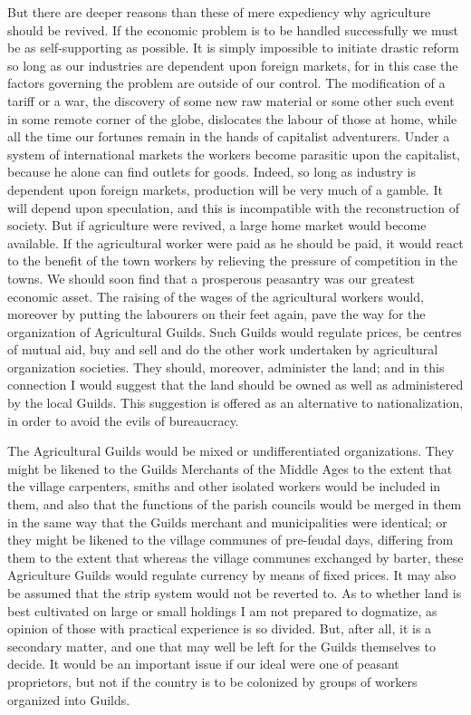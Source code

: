 \documentclass{book}
\begin{document}
But there are deeper reasons than these of mere expediency why agriculture should be revived. If the economic problem is to be handled successfully we must be as self-supporting as possible. It is simply impossible to initiate drastic reform so long as our industries are dependent upon foreign markets, for in this case the factors governing the problem are outside of our control. The modification of a tariff or a war, the discovery of some new raw material or some other such event in some remote corner of the globe, dislocates the labour of those at home, while all the time our fortunes remain in the hands of capitalist adventurers. Under a system of international markets the workers become parasitic upon the capitalist, because he alone can find outlets for goods. Indeed, so long as industry is dependent upon foreign markets, production will be very much of a gamble. It will depend upon speculation, and this is incompatible with the reconstruction of society. But if agriculture were revived, a large home market would become available. If the agricultural worker were paid as he should be paid, it would react to the benefit of the town workers by relieving the pressure of competition in the towns. We should soon find that a prosperous peasantry was our greatest economic asset. The raising of the wages of the agricultural workers would, moreover by putting the labourers on their feet again, pave the way for the organization of Agricultural Guilds. Such Guilds would regulate prices, be centres of mutual aid, buy and sell and do the other work undertaken by agricultural organization societies. They should, moreover, administer the land; and in this connection I would suggest that the land should be owned as well as administered by the local Guilds. This suggestion is offered as an alternative to nationalization, in order to avoid the evils of bureaucracy.

The Agricultural Guilds would be mixed or undifferentiated organizations. They might be likened to the Guilds Merchants of the Middle Ages to the extent that the village carpenters, smiths and other isolated workers would be included in them, and also that the functions of the parish councils would be merged in them in the same way that the Guilds merchant and municipalities were identical; or they might be likened to the village communes of pre-feudal days, differing from them to the extent that whereas the village communes exchanged by barter, these Agriculture Guilds would regulate currency by means of fixed prices. It may also be assumed that the strip system would not be reverted to. As to whether land is best cultivated on large or small holdings I am not prepared to dogmatize, as opinion of those with practical experience is so divided. But, after all, it is a secondary matter, and one that may well be left for the Guilds themselves to decide. It would be an important issue if our ideal were one of peasant proprietors, but not if the country is to be colonized by groups of workers organized into Guilds.
\end{document}
